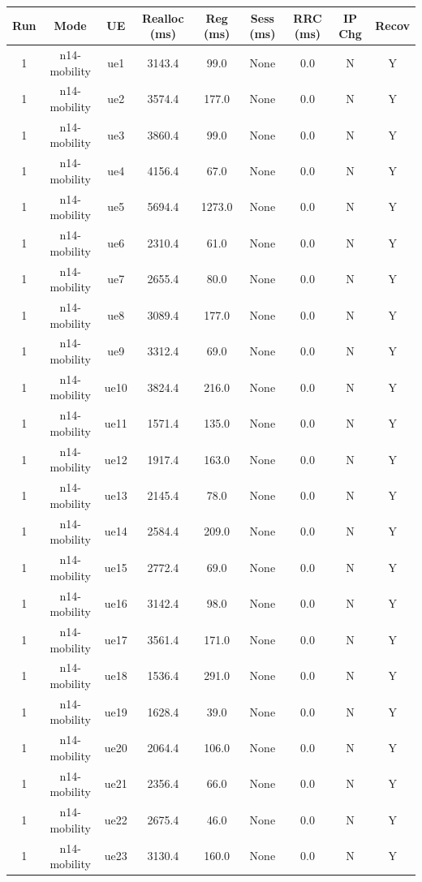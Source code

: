 \begin{table}[ht]
\centering
\begin{tabular}{|c|c|c|c|c|c|c|c|c|}
\hline
Run & Mode & UE & Realloc (ms) & Reg (ms) & Sess (ms) & RRC (ms) & IP Chg & Recov \\
\hline
1 & n14-mobility & ue1 & 3143.4 & 99.0 & None & 0.0 & N & Y \\
1 & n14-mobility & ue2 & 3574.4 & 177.0 & None & 0.0 & N & Y \\
1 & n14-mobility & ue3 & 3860.4 & 99.0 & None & 0.0 & N & Y \\
1 & n14-mobility & ue4 & 4156.4 & 67.0 & None & 0.0 & N & Y \\
1 & n14-mobility & ue5 & 5694.4 & 1273.0 & None & 0.0 & N & Y \\
1 & n14-mobility & ue6 & 2310.4 & 61.0 & None & 0.0 & N & Y \\
1 & n14-mobility & ue7 & 2655.4 & 80.0 & None & 0.0 & N & Y \\
1 & n14-mobility & ue8 & 3089.4 & 177.0 & None & 0.0 & N & Y \\
1 & n14-mobility & ue9 & 3312.4 & 69.0 & None & 0.0 & N & Y \\
1 & n14-mobility & ue10 & 3824.4 & 216.0 & None & 0.0 & N & Y \\
1 & n14-mobility & ue11 & 1571.4 & 135.0 & None & 0.0 & N & Y \\
1 & n14-mobility & ue12 & 1917.4 & 163.0 & None & 0.0 & N & Y \\
1 & n14-mobility & ue13 & 2145.4 & 78.0 & None & 0.0 & N & Y \\
1 & n14-mobility & ue14 & 2584.4 & 209.0 & None & 0.0 & N & Y \\
1 & n14-mobility & ue15 & 2772.4 & 69.0 & None & 0.0 & N & Y \\
1 & n14-mobility & ue16 & 3142.4 & 98.0 & None & 0.0 & N & Y \\
1 & n14-mobility & ue17 & 3561.4 & 171.0 & None & 0.0 & N & Y \\
1 & n14-mobility & ue18 & 1536.4 & 291.0 & None & 0.0 & N & Y \\
1 & n14-mobility & ue19 & 1628.4 & 39.0 & None & 0.0 & N & Y \\
1 & n14-mobility & ue20 & 2064.4 & 106.0 & None & 0.0 & N & Y \\
1 & n14-mobility & ue21 & 2356.4 & 66.0 & None & 0.0 & N & Y \\
1 & n14-mobility & ue22 & 2675.4 & 46.0 & None & 0.0 & N & Y \\
1 & n14-mobility & ue23 & 3130.4 & 160.0 & None & 0.0 & N & Y \\

\end{tabular}
\end{table}
